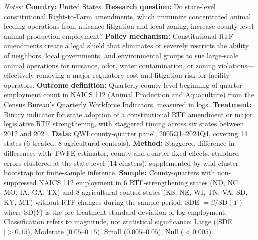 \begin{table}[H]
\begin{threeparttable}
\begin{tablenotes}[flushleft]
\item \textit{Notes:} \textbf{Country:} United States. \textbf{Research question:} Do state-level constitutional Right-to-Farm amendments, which immunize concentrated animal feeding operations from nuisance litigation and local zoning, increase county-level animal production employment? \textbf{Policy mechanism:} Constitutional RTF amendments create a legal shield that eliminates or severely restricts the ability of neighbors, local governments, and environmental groups to sue large-scale animal operations for nuisance, odor, water contamination, or zoning violations---effectively removing a major regulatory cost and litigation risk for facility operators. \textbf{Outcome definition:} Quarterly county-level beginning-of-quarter employment count in NAICS 112 (Animal Production and Aquaculture) from the Census Bureau's Quarterly Workforce Indicators, measured in logs. \textbf{Treatment:} Binary indicator for state adoption of a constitutional RTF amendment or major legislative RTF strengthening, with staggered timing across six states between 2012 and 2021. \textbf{Data:} QWI county-quarter panel, 2005Q1--2024Q4, covering 14 states (6 treated, 8 agricultural controls). \textbf{Method:} Staggered difference-in-differences with TWFE estimator, county and quarter fixed effects, standard errors clustered at the state level (14 clusters), supplemented by wild cluster bootstrap for finite-sample inference. \textbf{Sample:} County-quarters with non-suppressed NAICS 112 employment in 6 RTF-strengthening states (ND, NC, MO, IA, GA, TX) and 8 agricultural control states (KS, NE, WI, TN, VA, SD, KY, MT) without RTF changes during the sample period. SDE $= \hat{\beta} / \text{SD}(Y)$ where SD($Y$) is the pre-treatment standard deviation of log employment. Classification refers to magnitude, not statistical significance: Large ($|$SDE$| > 0.15$), Moderate ($0.05$--$0.15$), Small ($0.005$--$0.05$), Null ($< 0.005$).
\end{tablenotes}
\end{threeparttable}
\end{table}
